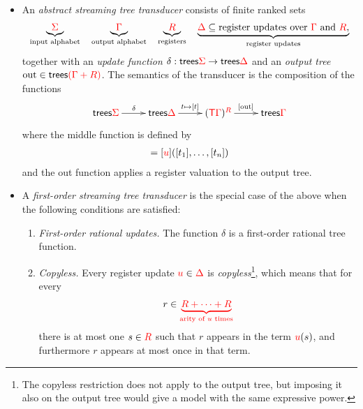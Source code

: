 \begin{definition}\label{def:stt}
\ 
    \begin{itemize}
        \item An  \emph{abstract streaming tree transducer} consists of finite ranked sets
        \begin{align*}
           \underbrace{{\color{red}{\Sigma}}}_{\text{input alphabet}} \quad 
           \underbrace{{\color{red}{\Gamma}}}_{\text{output alphabet}} \quad 
           \underbrace{{\color{red}{R}}}_{\text{registers}} \quad 
           \underbrace{{\color{red}{\Delta}} \subseteq \text{register updates over ${\color{red}{\Gamma}}$ and ${\color{red}{R}}$},}_{\text{register updates}}
        \end{align*}
           together with an \emph{update function} $\delta : \mathsf {trees} {\color{red}{\Sigma}} \to \mathsf {trees} {\color{red}{\Delta}}$ and an \emph{output tree} $\mathrm{out} \in \mathsf {trees} {\color{red}{(\Gamma + R)}}$. 
           The semantics of the transducer is the composition of the functions
    \begin{align*}
        \xymatrix{
            \trees \rSigma \ar[r]^{\delta} & \trees \rDelta \ar[r]^{t \mapsto [t]} & (\tmonad \rGamma)^\regnames \ar[r]^{[\outtree]} & \trees \rGamma
        }
    \end{align*}
    where the middle function is defined by 
    \begin{align*}
        [\ranked u \tensorpair{t_1,\ldots,t_n}] = [\ranked u]([t_1],\ldots,[t_n])
    \end{align*}
    and the out function applies a register valuation to the output tree. 
    \item A \emph{first-order streaming tree transducer} is the special case of the above when the following conditions are satisfied:
    \begin{enumerate}
        \item \emph{First-order rational updates.} The function $\delta$ is a first-order rational tree function.
        \item \emph{Copyless.} Every register update ${\color{red}{u}} \in {\color{red}{\Delta}}$ is \emph{copyless}\footnote{The copyless restriction does not apply to the output tree, but imposing it also on the output tree would give a model with the same expressive power.}, which means that for every
        \begin{align*}
            r \in {\color{red}{\underbrace{{{\color{red}{R}}}+ \cdots + {{\color{red}{R}}}}_{\text{arity of $u$ times}}}}
        \end{align*}
        there is at most one $s \in {{\color{red}{R}}}$ such that $r$ appears in the term  ${\color{red}{u}}(s)$, and furthermore $r$ appears at most once in that term. 

\end{enumerate}
\end{itemize}
\end{definition}
